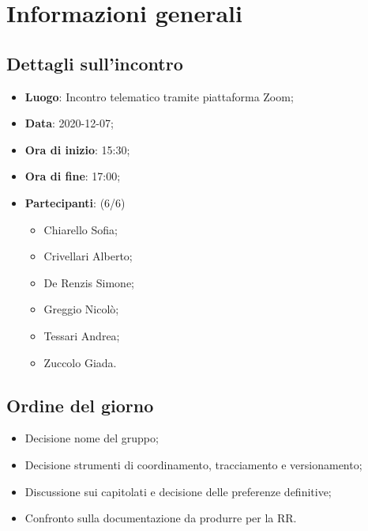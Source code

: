 \section{Informazioni generali}

\subsection{Dettagli sull'incontro}
\begin{itemize}
\item \textbf{Luogo}: Incontro telematico tramite piattaforma Zoom;
\item \textbf{Data}: 2020-12-07;
\item \textbf{Ora di inizio}: 15:30;
\item \textbf{Ora di fine}: 17:00;
\item \textbf{Partecipanti}: (6/6)
\begin{itemize}
	\item Chiarello Sofia;
    \item Crivellari Alberto;
    \item De Renzis Simone;
    \item Greggio Nicolò;
    \item Tessari Andrea;
    \item Zuccolo Giada.
\end{itemize}
\end{itemize}

\subsection{Ordine del giorno}
\begin{itemize}
	\item Decisione nome del gruppo;
	\item Decisione strumenti di coordinamento, tracciamento e versionamento;
	\item Discussione sui capitolati e decisione delle preferenze definitive;
	\item Confronto sulla documentazione da produrre per la RR.
\end{itemize}


